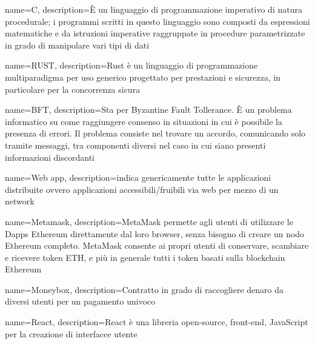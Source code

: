 {
	name={C},
	description={È un linguaggio di programmazione imperativo di natura procedurale; i programmi scritti in questo linguaggio sono composti da espressioni matematiche e da istruzioni imperative raggruppate in procedure parametrizzate in grado di manipolare vari tipi di dati}
}

{
	name={RUST},
	description={Rust è un linguaggio di programmazione multiparadigma per uso generico progettato per prestazioni e sicurezza, in particolare per la concorrenza sicura}
}

{
	name={BFT},
	description={Sta per Byzantine Fault Tollerance. È un problema informatico su come raggiungere consenso in situazioni in cui è possibile la presenza di errori. Il problema consiste nel trovare un accordo, comunicando solo tramite messaggi, tra componenti diversi nel caso in cui siano presenti informazioni discordanti}
}

{
	name={Web app},
	description={indica genericamente tutte le applicazioni distribuite ovvero applicazioni accessibili/fruibili via web per mezzo di un network}
}

{
	name={Metamask},
	description={MetaMask permette agli utenti di utilizzare le Dapps Ethereum direttamente dal loro browser, senza bisogno di creare un nodo Ethereum completo. MetaMask consente ai propri utenti di conservare, scambiare e ricevere token ETH, e più in generale tutti i token basati sulla blockchain Ethereum}
}

{
	name={Moneybox},
	description={Contratto in grado di raccogliere denaro da diversi utenti per un pagamento univoco}
}

{
	name={React},
	description={React è una libreria open-source, front-end, JavaScript per la creazione di interfacce utente}
}